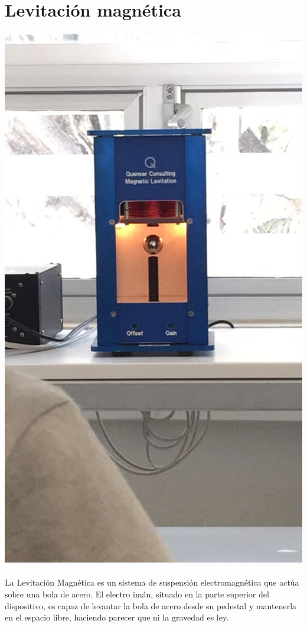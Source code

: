 \documentclass[12pt,a4paper]{book}
\begin{document}
\section{Levitación magnética}
\includegraphics[scale=.25]{./3.jpeg}
\\
\\
La Levitación Magnética es un sistema de suspensión electromagnética que actúa sobre una bola de acero. El electro imán, situado en la parte superior del dispositivo, es capaz de levantar la bola de acero desde su pedestal y mantenerla en el espacio libre, haciendo parecer que ni la gravedad es ley.
\end{document}
